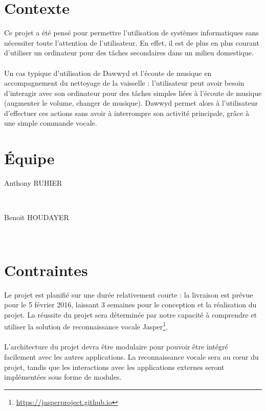 \documentclass[12pt]{article}
\begin{document}
    \section{Contexte}

Ce projet a été pensé pour permettre l'utilisation de systèmes informatiques 
sans nécessiter toute l'attention de l'utilisateur. En effet, il est de plus en
plus courant d'utiliser un ordinateur pour des tâches secondaires dans un
milieu domestique.

\paragraph{}
Un cas typique d'utilisation de Dawwyd et l'écoute de musique
en accompagnement du nettoyage de la vaisselle : l'utilisateur peut avoir
besoin d'interagir avec son ordinateur pour des tâches simples liées à l'écoute
de musique (augmenter le volume, changer de musique).
Dawwyd permet alors à l'utilisateur d'effectuer ces actions sans avoir à
interrompre son activité principale, grâce à une simple commande vocale.

    \section{Équipe}

\begin{description}
    \item[Anthony RUHIER] \hfill \\
    \item[Benoit HOUDAYER] \hfill \\

\end{description}

    \section{Contraintes}

Le projet est planifié sur une durée relativement courte : la livraison
est prévue pour le 5 février 2016, laissant 3 semaines pour le conception et la
réalisation du projet. La réussite du projet sera déterminée par notre capacité
à comprendre et utiliser la solution de reconnaissance vocale
Jasper\footnote{\url{https://jasperproject.github.io}}.

\paragraph{}
L'architecture du projet devra être modulaire pour pouvoir être intégré
facilement avec les autres applications. La reconnaissance vocale sera au
cœur du projet, tandis que les interactions avec les applications externes
seront implémentées sous forme de modules.
\end{document}
